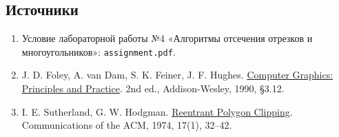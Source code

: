 \documentclass[12pt,a4paper]{extarticle}
\newcommand{\code}[1]{\texttt{\small #1}}
\begin{document}
\subsection*{Источники}
\begin{enumerate}
\item Условие лабораторной работы №4 «Алгоритмы отсечения отрезков и многоугольников»: \code{assignment.pdf}.
\item J. D. Foley, A. van Dam, S. K. Feiner, J. F. Hughes. \href{https://www.informit.com/store/computer-graphics-principles-practice-9780201121100}{Computer Graphics: Principles and Practice}. 2nd ed., Addison-Wesley, 1990, \S 3.12.
\item I. E. Sutherland, G. W. Hodgman. \href{https://doi.org/10.1145/360767.360802}{Reentrant Polygon Clipping}. Communications of the ACM, 1974, 17(1), 32--42.
\end{enumerate}
\end{document}
